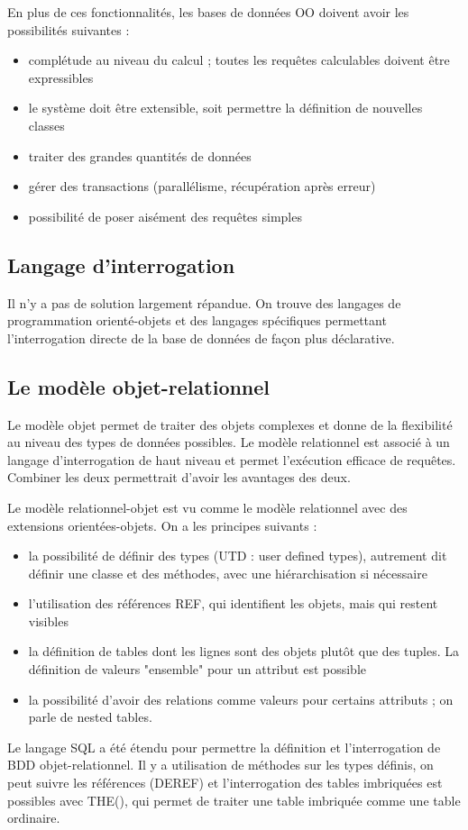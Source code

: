 		En plus de ces fonctionnalités, les bases de données OO doivent avoir les possibilités suivantes :
		
		\begin{itemize}
			\item complétude au niveau du calcul ; toutes les requêtes calculables doivent être expressibles
			\item le système doit être extensible, soit permettre la définition de nouvelles classes
			\item traiter des grandes quantités de données
			\item gérer des transactions (parallélisme, récupération après erreur)
			\item possibilité de poser aisément des requêtes simples
		\end{itemize}
		
		\subsection{Langage d'interrogation}
		
		Il n'y a pas de solution largement répandue. On trouve des langages de programmation orienté-objets et des langages spécifiques permettant l'interrogation directe de la base de données de façon plus déclarative.
		
		\subsection{Le modèle objet-relationnel}
		
		Le modèle objet permet de traiter des objets complexes et donne de la flexibilité au niveau des types de données possibles. Le modèle relationnel est associé à un langage d'interrogation de haut niveau et permet l'exécution efficace de requêtes. Combiner les deux permettrait d'avoir les avantages des deux.
		
		Le modèle relationnel-objet est vu comme le modèle relationnel avec des extensions orientées-objets. On a les principes suivants :
		
		\begin{itemize}
			\item la possibilité de définir des types (UTD : user defined types), autrement dit définir une classe et des méthodes, avec une hiérarchisation si nécessaire
			\item l'utilisation des références  REF, qui identifient les objets, mais qui restent visibles
			\item la définition de tables dont les lignes sont des objets plutôt que des tuples. La définition de valeurs "ensemble" pour un attribut est possible
			\item la possibilité d'avoir des relations comme valeurs pour certains attributs ; on parle de nested tables.
		\end{itemize}
		
		Le langage SQL a été étendu pour permettre la définition et l'interrogation de BDD objet-relationnel. Il y a utilisation de méthodes sur les types définis, on peut suivre les références (DEREF) et l'interrogation des tables imbriquées est possibles avec THE(), qui permet de traiter une table imbriquée comme une table ordinaire.
		
